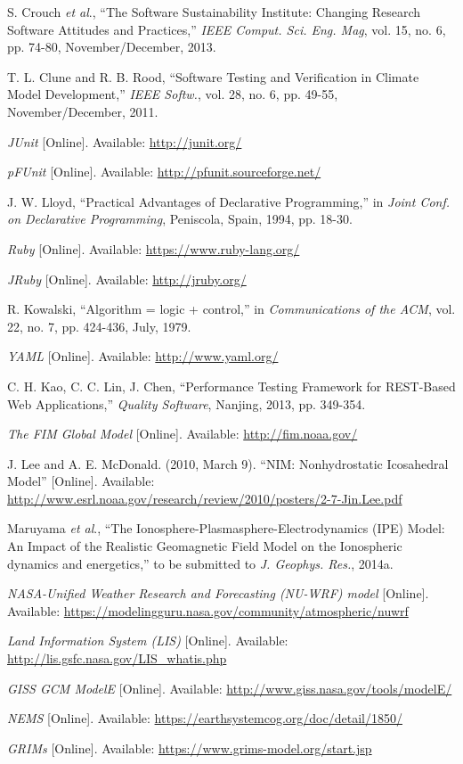 \documentclass[conference]{IEEEtran}
\begin{document}
\begin{thebibliography}{1}
S. Crouch \emph{et al}., ``The Software Sustainability Institute: Changing Research Software Attitudes and Practices,'' \emph{IEEE Comput. Sci. Eng. Mag}, vol. 15, no. 6, pp. 74-80, November/December, 2013.

T. L. Clune and R. B. Rood, ``Software Testing and Verification in Climate Model Development,'' \emph{IEEE Softw.}, vol. 28, no. 6, pp. 49-55, November/December, 2011.

\emph{JUnit} [Online]. Available: \url{http://junit.org/}

\emph{pFUnit} [Online]. Available: \url{http://pfunit.sourceforge.net/}

J. W. Lloyd, ``Practical Advantages of Declarative Programming,'' in \emph{Joint Conf. on Declarative Programming}, Peniscola, Spain, 1994, pp. 18-30.

\vspace{141mm}

\emph{Ruby} [Online]. Available: \url{https://www.ruby-lang.org/}

\emph{JRuby} [Online]. Available: \url{http://jruby.org/}

R. Kowalski, ``Algorithm = logic + control,'' in \emph{Communications of the ACM}, vol. 22, no. 7, pp. 424-436, July, 1979.

\emph{YAML} [Online]. Available: \url{http://www.yaml.org/}

C. H. Kao, C. C. Lin, J. Chen, ``Performance Testing Framework for REST-Based Web Applications,'' \emph{Quality Software}, Nanjing, 2013, pp. 349-354.

\emph{The FIM Global Model} [Online]. Available: \url{http://fim.noaa.gov/}

J. Lee and A. E. McDonald. (2010, March 9). ``NIM: Nonhydrostatic Icosahedral Model'' [Online]. Available: \url{http://www.esrl.noaa.gov/research/review/2010/posters/2-7-Jin.Lee.pdf}

Maruyama \emph{et al}., ``The Ionosphere-Plasmasphere-Electrodynamics (IPE) Model: An Impact of the Realistic Geomagnetic Field Model on the Ionospheric dynamics and energetics,'' to be submitted to \emph{J. Geophys. Res.}, 2014a.

\emph{NASA-Unified Weather Research and Forecasting (NU-WRF) model} [Online]. Available: \url{https://modelingguru.nasa.gov/community/atmospheric/nuwrf}

\emph{Land Information System (LIS)} [Online]. Available: \url{http://lis.gsfc.nasa.gov/LIS_whatis.php}

\emph{GISS GCM ModelE} [Online]. Available: \url{http://www.giss.nasa.gov/tools/modelE/}

\emph{NEMS} [Online]. Available: \url{https://earthsystemcog.org/doc/detail/1850/}

\emph{GRIMs} [Online]. Available: \url{https://www.grims-model.org/start.jsp}


\end{thebibliography}
\end{document}
